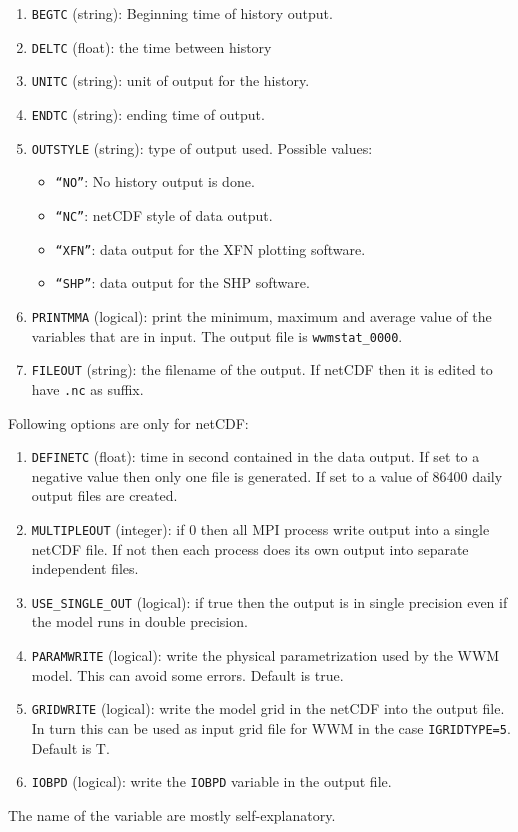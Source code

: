\documentclass[12pt]{amsart}
\begin{document}
\begin{enumerate}
\item {\tt BEGTC} (string): Beginning time of history output.
\item {\tt DELTC} (float): the time between history 
\item {\tt UNITC} (string): unit of output for the history.
\item {\tt ENDTC} (string): ending time of output.
\item {\tt OUTSTYLE} (string): type of output used. Possible values:
  \begin{itemize}
  \item {\tt ``NO''}: No history output is done.
  \item {\tt ``NC''}: netCDF style of data output.
  \item {\tt ``XFN''}: data output for the XFN plotting software.
  \item {\tt ``SHP''}: data output for the SHP software.
  \end{itemize}
\item {\tt PRINTMMA} (logical): print the minimum, maximum and average value of the variables that are in input. The output file is {\tt wwmstat\_0000}.
\item {\tt FILEOUT} (string): the filename of the output. If netCDF then it is edited to have {\tt .nc} as suffix.  
\end{enumerate}
Following options are only for netCDF:
\begin{enumerate}
\item {\tt DEFINETC} (float): time in second contained in the data output.
If set to a negative value then only one file is generated.
If set to a value of 86400 daily output files are created.
\item {\tt MULTIPLEOUT} (integer): if 0 then all MPI process write output into a single netCDF file. If not then each process does its own output into separate independent files.
\item {\tt USE\_SINGLE\_OUT} (logical): if true then the output is in single precision even if the model runs in double precision.
\item {\tt PARAMWRITE} (logical): write the physical parametrization used by the WWM model. This can avoid some errors. Default is true.
\item {\tt GRIDWRITE} (logical): write the model grid in the netCDF into the output file. In turn this can be used as input grid file for WWM in the case {\tt IGRIDTYPE=5}. Default is T.
\item {\tt IOBPD} (logical): write the {\tt IOBPD} variable in the output file.
\end{enumerate}
The name of the variable are mostly self-explanatory.
\end{document}

